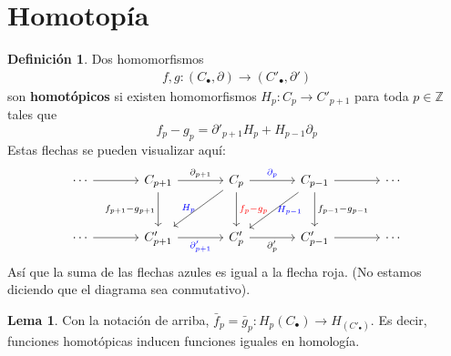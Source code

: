 \documentclass[spanish]{book}
\theoremstyle{definition}
\newtheorem*{defn}{Definición}
\newtheorem*{lema}{Lema}
\newcommand{\Z}{\mathbb{Z}}
\begin{document}
	\section{Homotopía}
	\begin{defn}
		Dos homomorfismos 
		\begin{align*}
			f,g:(C_\bullet,\partial)\to(C'_\bullet,\partial')
		\end{align*}
		son \textbf{homotópicos} si existen homomorfismos $H_p:C_p\to C'_{p+1}$ para toda $p\in\Z$ tales que \[f_p-g_p=\partial'_{p+1}H_p+H_{p-1}\partial_p\] Estas flechas se pueden visualizar aquí:
		\[\begin{tikzcd}[column sep=large, row sep=large]
			\cdots \arrow{r} & C_{p+1} \arrow{r}{\partial_{p+1}} \arrow{d}[left]{f_{p+1}-g_{p+1}} & C_p \arrow{r}[blue]{\partial_p} \arrow{d}[right,red]{f_p-g_p} \arrow{ld}[left,blue]{H_p} & C_{p-1} \arrow{r} \arrow{d}[right]{f_{p-1}-g_{p-1}} \arrow{ld}[right,blue]{H_{p-1}} & \cdots \\
			\cdots \arrow{r} & C'_{p+1} \arrow{r}[below,blue]{\partial'_{p+1}} & C'_p \arrow{r}[below]{\partial_p'} & C'_{p-1} \arrow{r} & \cdots
		\end{tikzcd}
		\]
		Así que la suma de las flechas azules es igual a la flecha roja. (No estamos diciendo que el diagrama sea conmutativo).
	\end{defn}
	\begin{lema}
		Con la notación de arriba, $\bar f_p=\bar g_p:H_p(C_\bullet)\to H_(C'_\bullet)$. Es decir, funciones homotópicas inducen funciones iguales en homología.
	\end{lema}
\end{document}
